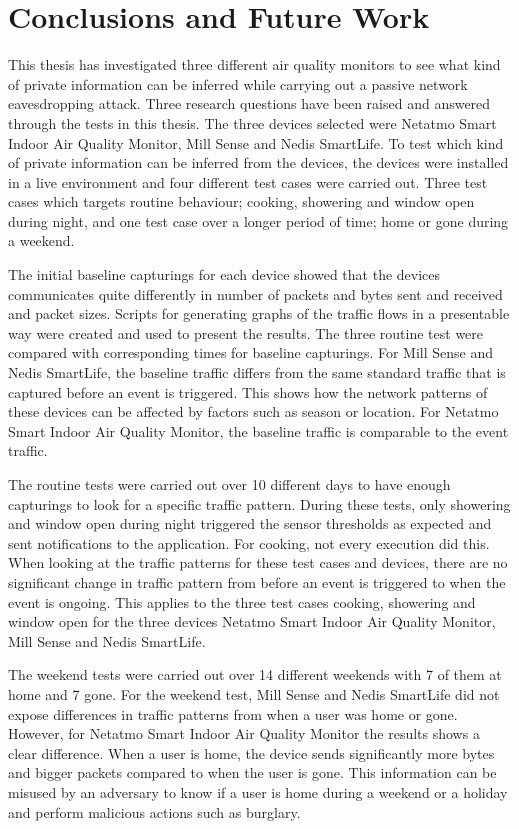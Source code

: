 \chapter{Conclusions and Future Work}
This thesis has investigated three different air quality monitors to see what kind of private information can be inferred while carrying out a passive network eavesdropping attack. Three research questions have been raised and answered through the tests in this thesis. The three devices selected were Netatmo Smart Indoor Air Quality Monitor, Mill Sense and Nedis SmartLife. To test which kind of private information can be inferred from the devices, the devices were installed in a live environment and four different test cases were carried out. Three test cases which targets routine behaviour; cooking, showering and window open during night, and one test case over a longer period of time; home or gone during a weekend. 

The initial baseline capturings for each device showed that the devices communicates quite differently in number of packets and bytes sent and received and packet sizes. Scripts for generating graphs of the traffic flows in a presentable way were created and used to present the results. The three routine test were compared with corresponding times for baseline capturings. For Mill Sense and Nedis SmartLife, the baseline traffic differs from the same standard traffic that is captured before an event is triggered. This shows how the network patterns of these devices can be affected by factors such as season or location. For Netatmo Smart Indoor Air Quality Monitor, the baseline traffic is comparable to the event traffic. 

The routine tests were carried out over 10 different days to have enough capturings to look for a specific traffic pattern. During these tests, only showering and window open during night triggered the sensor thresholds as expected and sent notifications to the application. For cooking, not every execution did this. When looking at the traffic patterns for these test cases and devices, there are no significant change in traffic pattern from before an event is triggered to when the event is ongoing. This applies to the three test cases cooking, showering and window open for the three devices Netatmo Smart Indoor Air Quality Monitor, Mill Sense and Nedis SmartLife.  

The weekend tests were carried out over 14 different weekends with 7 of them at home and 7 gone. For the weekend test, Mill Sense and Nedis SmartLife did not expose differences in traffic patterns from when a user was home or gone. However, for Netatmo Smart Indoor Air Quality Monitor the results shows a clear difference. When a user is home, the device sends significantly more bytes and bigger packets compared to when the user is gone. This information can be misused by an adversary to know if a user is home during a weekend or a holiday and perform malicious actions such as burglary. 

